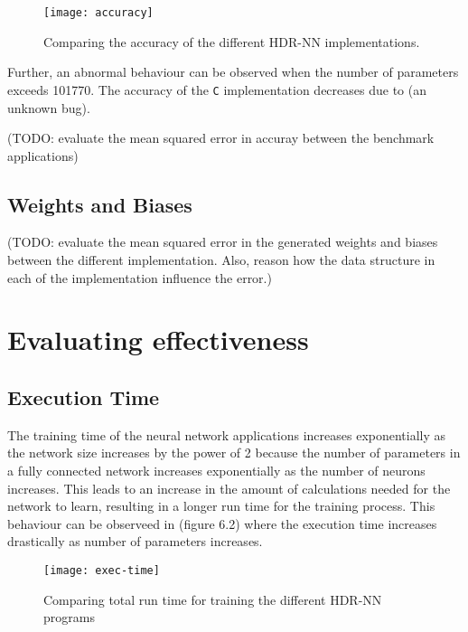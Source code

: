 \begin{figure}[!ht]
	\centering
	\texttt{[image: accuracy]}
	\caption[HDR-NN Accuracy]{Comparing the accuracy of the different HDR-NN implementations.}
\end{figure}

Further, an abnormal behaviour can be observed when the number of parameters exceeds 101770. The accuracy of the \verb!C! implementation decreases due to (an unknown bug).

(TODO: evaluate the mean squared error in accuray between the benchmark applications)

\subsection{Weights and Biases}
(TODO: evaluate the mean squared error in the generated weights and biases between the different implementation. Also, reason how the data structure in each of the implementation influence the error.)

\section{Evaluating effectiveness}


\subsection{Execution Time}
The training time of the neural network applications increases exponentially as the network size increases by the power of 2 because the number of parameters in a fully connected network increases exponentially as the number of neurons increases. This leads to an increase in the amount of calculations needed for the network to learn, resulting in a longer run time for the training process. This behaviour can be observeed in (figure 6.2) where the execution time increases drastically as number of parameters increases.

\begin{figure}[!ht]
	\centering
	\texttt{[image: exec-time]}
	\caption[Execution Time vs Model Parameters]{Comparing total run time for training the different HDR-NN programs}
\end{figure}


